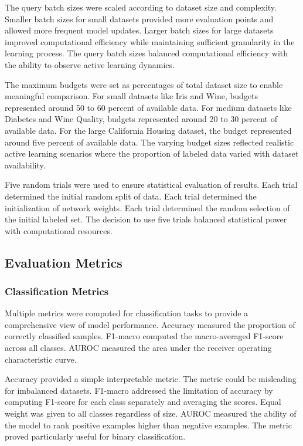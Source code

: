 \documentclass[conference]{IEEEtran}
\begin{document}
The query batch sizes were scaled according to dataset size and complexity. Smaller batch sizes for small datasets provided more evaluation points and allowed more frequent model updates. Larger batch sizes for large datasets improved computational efficiency while maintaining sufficient granularity in the learning process. The query batch sizes balanced computational efficiency with the ability to observe active learning dynamics.

The maximum budgets were set as percentages of total dataset size to enable meaningful comparison. For small datasets like Iris and Wine, budgets represented around 50 to 60 percent of available data. For medium datasets like Diabetes and Wine Quality, budgets represented around 20 to 30 percent of available data. For the large California Housing dataset, the budget represented around five percent of available data. The varying budget sizes reflected realistic active learning scenarios where the proportion of labeled data varied with dataset availability.

Five random trials were used to ensure statistical evaluation of results. Each trial determined the initial random split of data. Each trial determined the initialization of network weights. Each trial determined the random selection of the initial labeled set. The decision to use five trials balanced statistical power with computational resources.

\subsection{Evaluation Metrics}

\subsubsection{Classification Metrics}

Multiple metrics were computed for classification tasks to provide a comprehensive view of model performance. Accuracy measured the proportion of correctly classified samples. F1-macro computed the macro-averaged F1-score across all classes. AUROC measured the area under the receiver operating characteristic curve.

Accuracy provided a simple interpretable metric. The metric could be misleading for imbalanced datasets. F1-macro addressed the limitation of accuracy by computing F1-score for each class separately and averaging the scores. Equal weight was given to all classes regardless of size. AUROC measured the ability of the model to rank positive examples higher than negative examples. The metric proved particularly useful for binary classification.
\end{document}
